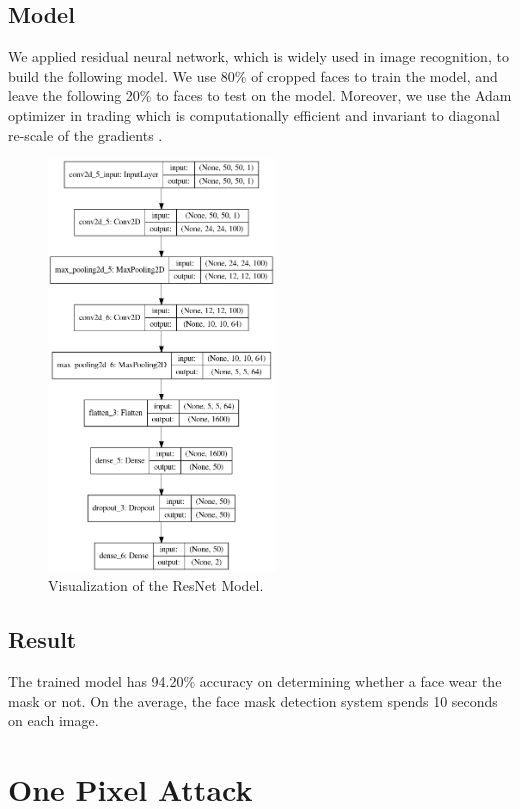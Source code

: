 \documentclass{article}
\begin{document}
\subsection{Model}
We applied residual neural network, which is widely used in image recognition, to build the following model. We use 80\% of cropped faces to train the model, and leave the following 20\% to faces to test on the model. Moreover, we use the Adam optimizer in trading which is computationally efficient and invariant to diagonal re-scale of the gradients \cite{onepixel}. 

\begin{figure}[h]
	\centering
    \includegraphics[width=6cm]{model.png}
    \caption{Visualization of the ResNet Model.}
\end{figure}


\subsection{Result}
The trained model has 94.20\% accuracy on determining whether a face wear the mask or not. On the average, the face mask detection system spends 10 seconds on each image.

\section{One Pixel Attack}
\end{document}
